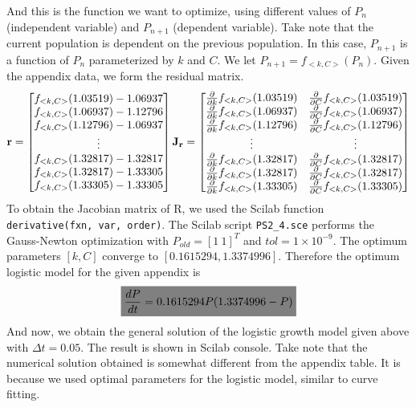 \documentclass[10pt, twocolumn]{article}
\newcommand{\highlight}[1]{\colorbox{gray}{$\displaystyle#1$}}
\begin{document}
	And this is the function we want to optimize, using different values of $P_n$ (independent variable) and $P_{n+1}$ (dependent variable).
	Take note that the current population is dependent on the previous population.
	In this case, $P_{n+1}$ is a function of $P_n$ parameterized by $k$ and $C$. We let $P_{n+1} = f_{<k, C>}(P_n)$.
	Given the appendix data, we form the residual matrix.
	$$\mathbf{r} = 
		\begin{bmatrix}
			f_{<k, C>}(1.03519) - 1.06937\\
			f_{<k, C>}(1.06937) - 1.12796\\
			f_{<k, C>}(1.12796) - 1.06937\\
			\vdots\\
			f_{<k, C>}(1.32817) - 1.32817\\
			f_{<k, C>}(1.32817) - 1.33305\\
			f_{<k, C>}(1.33305) - 1.33305
		\end{bmatrix}\\
		\mathbf{J_r} = 
		\begin{bmatrix}
			\frac{\partial}{\partial k}f_{<k, C>}(1.03519) & \frac{\partial}{\partial C}f_{<k, C>}(1.03519)\\
			\frac{\partial}{\partial k}f_{<k, C>}(1.06937) & \frac{\partial}{\partial C}f_{<k, C>}(1.06937)\\
			\frac{\partial}{\partial k}f_{<k, C>}(1.12796) & \frac{\partial}{\partial C}f_{<k, C>}(1.12796)\\
			\vdots&\vdots\\
			\frac{\partial}{\partial k}f_{<k, C>}(1.32817) & \frac{\partial}{\partial C}f_{<k, C>}(1.32817)\\
			\frac{\partial}{\partial k}f_{<k, C>}(1.32817) & \frac{\partial}{\partial C}f_{<k, C>}(1.32817)\\
			\frac{\partial}{\partial k}f_{<k, C>}(1.33305) & \frac{\partial}{\partial C}f_{<k, C>}(1.33305)
		\end{bmatrix}
	$$
	To obtain the Jacobian matrix of R, we used the Scilab function \texttt{derivative(fxn, var, order)}.
	The Scilab script \texttt{PS2\_4.sce} performs the Gauss-Newton optimization with $P_{old} = [1\:1]^T$ and $tol = 1\times10^{-9}$.
	The optimum parameters $[k, C]$ converge to $[0.1615294,1.3374996]$.
	Therefore the optimum logistic model for the given appendix is
	$$\highlight{\frac{dP}{dt}=0.1615294P(1.3374996-P)}
	$$
	And now, we obtain the general solution of the logistic growth model given above with $\Delta t=0.05$.
	The result is shown in Scilab console.
	Take note that the numerical solution obtained is somewhat different from the appendix table.
	It is because we used optimal parameters for the logistic model, similar to curve fitting.
	
\end{document}
